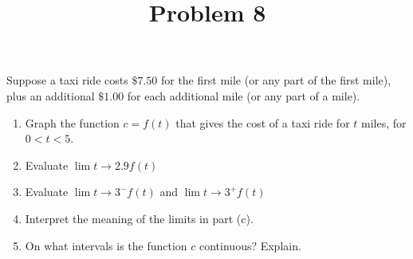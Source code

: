\documentclass{ximera}
\title[Problem 8]{Problem 8}
\begin{document}
\begin{abstract} \end{abstract}
\maketitle

\begin{problem}
Suppose a taxi ride costs $\$7.50$ for the first mile (or any part of the first mile), plus an additional $\$1.00$ for each additional mile (or any part of a mile).
\begin{enumerate}
	\item Graph the function $c=f(t)$ that gives the cost of a taxi ride for $t$ miles, for $0 < t < 5$.
\item Evaluate $\displaystyle \lim{t \to 2.9}f(t)$
\item Evaluate $\displaystyle \lim{t \to 3^-}f(t)$ and $\displaystyle \lim{t \to 3^+}f(t)$		
\item Interpret the meaning of the limits in part (c).
\item On what intervals is the function $c$ continuous?  Explain.
\end{enumerate}
\end{problem}
\end{document}
